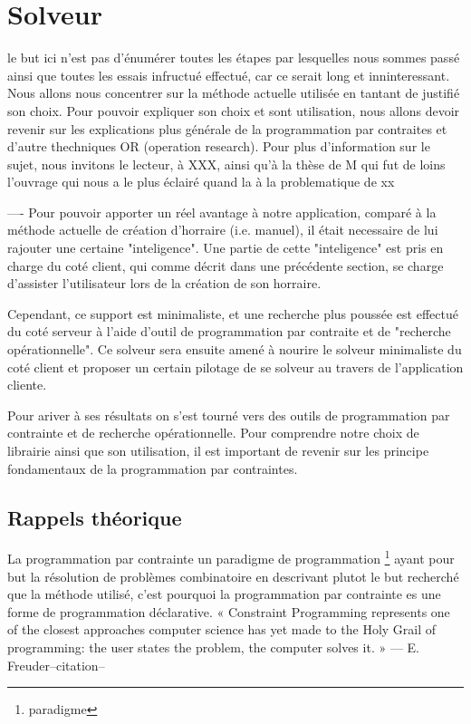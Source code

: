 \chapter{Solveur}
le but ici n'est pas d'énumérer toutes les étapes par lesquelles nous sommes passé ainsi que toutes les essais infructué effectué, car ce serait long et inninteressant. Nous allons nous concentrer sur la méthode actuelle utilisée en tantant de justifié son choix. Pour pouvoir expliquer son choix et sont utilisation, nous allons devoir revenir sur les explications plus générale de la programmation par contraites et d'autre thechniques OR (operation research).  Pour plus d'information sur le sujet, nous invitons le lecteur, à XXX, ainsi qu'à la thèse de M qui fut de loins l'ouvrage qui nous a le plus éclairé quand la à la problematique de xx


----
Pour pouvoir apporter un réel avantage à notre application, comparé à la méthode actuelle de création d'horraire (i.e. manuel), il était necessaire de lui rajouter une certaine "inteligence". 
Une partie de cette "inteligence" est pris en charge du coté client, qui comme décrit dans une précédente section, se charge d'assister l'utilisateur lors de la création de son horraire.

Cependant, ce support est minimaliste, et une recherche plus poussée est effectué du coté serveur à l'aide d'outil de programmation par contraite et de "recherche opérationnelle".  Ce solveur sera ensuite amené à nourire le solveur minimaliste du coté client et proposer un certain pilotage de se solveur au travers de l'application cliente. 

Pour ariver à ses résultats on s'est tourné vers des outils de programmation par contrainte et de recherche opérationnelle. 
Pour comprendre notre choix de librairie ainsi que son utilisation, il est important de revenir sur les principe fondamentaux de la programmation par contraintes.


\section{Rappels théorique}

La programmation par contrainte un paradigme de programmation \footnote{paradigme} ayant pour but la résolution de problèmes combinatoire en
descrivant plutot le but recherché que la méthode utilisé, c'est pourquoi la programmation par contrainte es une forme de programmation déclarative.
« Constraint Programming represents one of the closest approaches computer science has yet made to the Holy Grail of programming: the user states the problem, the computer solves it. »
— E. Freuder--citation--

